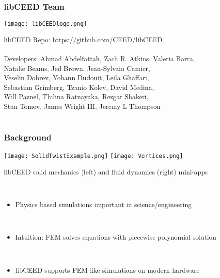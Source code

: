 \documentclass{beamer}
\begin{document}
\begin{frame}
\frametitle{libCEED Team}

\begin{center}
\texttt{[image: libCEEDlogo.png]}
\end{center}

{\flushleft

libCEED Repo: \href{https://github.com/CEED/libCEED}{https://github.com/CEED/libCEED}\\

~\\
Developers: Ahmad Abdelfattah, Zach R. Atkins, Valeria Barra,\\
\hspace{19mm} Natalie Beams, Jed Brown, Jean-Sylvain Camier,\\
\hspace{19mm} Veselin Dobrev, Yohann Dudouit, Leila Ghaffari,\\
\hspace{19mm} Sebastian Grimberg, Tzanio Kolev, David Medina,\\
\hspace{19mm} Will Paznel, Thilina Ratnayaka, Rezgar Shakeri,\\
\hspace{19mm} Stan Tomov, James Wright III, Jeremy L Thompson\\

~\\

}

\end{frame}


\begin{frame}
\begin{center}
\frametitle{Background}

\texttt{[image: SolidTwistExample.png]}
\texttt{[image: Vortices.png]}

{\small libCEED solid mechanics (left) and fluid dynamics (right) mini-apps}

~\\

\begin{itemize}

\item Physics based simulations important in science/engineering

~\\

\item Intuition: FEM solves equations with piecewise polynomial solution

~\\

\item libCEED supports FEM-like simulations on modern hardware 

\end{itemize}

\end{center}
\end{frame}
\end{document}
